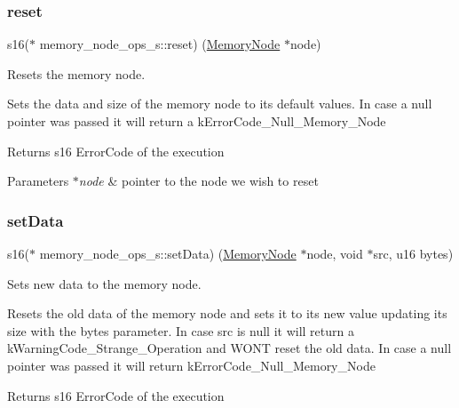 \subsubsection{\texorpdfstring{reset}{reset}}
{\footnotesize\ttfamily s16($\ast$ memory\+\_\+node\+\_\+ops\+\_\+s\+::reset) (\hyperlink{structmemory__node__s}{Memory\+Node} $\ast$node)}



Resets the memory node. 

Sets the data and size of the memory node to it\textquotesingle{}s default values. In case a null pointer was passed it will return a k\+Error\+Code\+\_\+\+Null\+\_\+\+Memory\+\_\+\+Node

\begin{DoxyReturn}{Returns}
s16 Error\+Code of the execution 
\end{DoxyReturn}

\begin{DoxyParams}{Parameters}
{\em $\ast$node} & pointer to the node we wish to reset \\
\hline
\end{DoxyParams}
\mbox{\label{structmemory__node__ops__s_a7b21a53d026216de8e44299e4b6191fb}} 
\subsubsection{\texorpdfstring{set\+Data}{setData}}
{\footnotesize\ttfamily s16($\ast$ memory\+\_\+node\+\_\+ops\+\_\+s\+::set\+Data) (\hyperlink{structmemory__node__s}{Memory\+Node} $\ast$node, void $\ast$src, u16 bytes)}



Sets new data to the memory node. 

Resets the old data of the memory node and sets it to it\textquotesingle{}s new value updating it\textquotesingle{}s size with the bytes parameter. In case src is null it will return a k\+Warning\+Code\+\_\+\+Strange\+\_\+\+Operation and W\+ON\textquotesingle{}T reset the old data. In case a null pointer was passed it will return k\+Error\+Code\+\_\+\+Null\+\_\+\+Memory\+\_\+\+Node

\begin{DoxyReturn}{Returns}
s16 Error\+Code of the execution 
\end{DoxyReturn}

